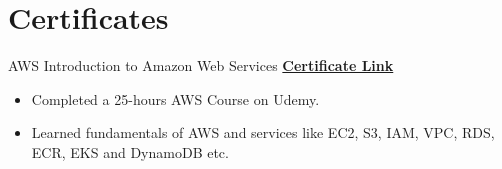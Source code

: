 \documentclass[letterpaper]{DS_class_file} %
\begin{document}
\section{Certificates}

\begin{twenty} %
        \twentyitem
	{AWS}
	{}
	{\hspace{0.3cm}Introduction to Amazon Web Services}
	{\href{https://www.udemy.com/certificate/UC-8773cc22-c86d-43a9-89ad-4c4e8e02aa38/}{\textbf{Certificate Link}}}
	{}
	{
		{\begin{itemize}
				\item Completed a 25-hours AWS Course on Udemy.
				\item Learned fundamentals of AWS and services like EC2, S3, IAM, VPC, RDS, ECR, EKS and DynamoDB etc.
		\end{itemize}}
	}
	\\


\end{twenty}
\end{document}
